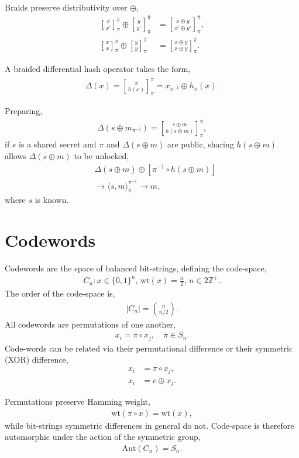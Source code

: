 \documentclass[twocolumn, aps, amsmath, amssymb, nofootinbib, superscriptaddress, longbibliography, doublefloatfix, table-of-contents, eqsecnum, rmp]{revtex4-2}
\def\symbraid#1{\langle#1\rangle_{\pi}^{\pi^{-1}}}
\newcommand{\stackbraid}[2]{{\genfrac{[}{]}{0pt}{}{{#1}}{{#2}}}^{\bar{\pi}}_{\pi}}
\begin{document}
Braids preserve distributivity over $\oplus$,
\begin{align}
	\stackbraid{x}{x'} \oplus \stackbraid{y}{y'} &= \stackbraid{x\oplus y}{x'\oplus y'},\nonumber\\
	\stackbraid{x}{x} \oplus \stackbraid{y}{y} &= \stackbraid{x\oplus y}{x\oplus y}.
\end{align}

A braided differential hash operator takes the form,
\begin{align}
	\Delta(x) = \stackbraid{x}{h(x)} = x_{\pi^{-1}} \oplus h_{\pi}(x).
\end{align}

Preparing,
\begin{align}
	\Delta(s\oplus m_{\pi^{-2}}) = \stackbraid{s\oplus m}{h(s\oplus m)},
\end{align}
if $s$ is a shared secret and $\pi$ and $\Delta(s\oplus m)$ are public, sharing $h(s\oplus m)$ allows $\Delta(s\oplus m)$ to be unlocked,
\begin{align}
	&\Delta(s\oplus m) \oplus [\pi^{-1}\circ h(s\oplus m)]\nonumber\\
	&\to \symbraid{s,m} \to m,
\end{align}
where $s$ is known.

\section{Codewords}

Codewords are the space of balanced bit-strings, defining the code-space,
\begin{align}
	C_n: x\in\{0,1\}^n,\, \mathrm{wt}(x)=\frac{n}{2},\, n\in 2\mathbb{Z}^+.
\end{align}
The order of the code-space is,
\begin{align}
	|C_n| = \binom{n}{n/2}.
\end{align}
All codewords are permutations of one another,
\begin{align}
	x_i = \pi \circ x_j,\quad \pi\in S_n.
\end{align}
Code-words can be related via their permutational difference or their symmetric (XOR) difference,
\begin{align}
	x_i &= \pi \circ x_j,\nonumber\\
	x_i &= c \oplus x_j.
\end{align}

Permutations preserve Hamming weight,
\begin{align}
	\mathrm{wt}(\pi\circ x) = \mathrm{wt}(x),
\end{align}
while bit-strings symmetric differences in general do not. Code-space is therefore automorphic under the action of the symmetric group,
\begin{align}
	\mathrm{Aut}(C_n) = S_n.
\end{align}
\end{document}
